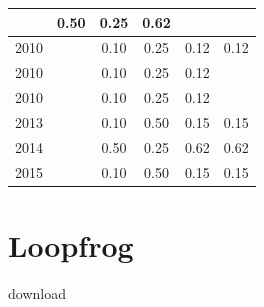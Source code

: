 \begin{table}[H]
\begin{tabular}{| l | c | c | c | c | c |}
          &
          0.50
          &
          0.25
          &
          0.62
          &
          \\
\hline
            2010
          &
          
          &
          0.10
          &
          0.25
          &
          0.12
          &
            {\color{red} 0.12}
          \\
            2010
          &
          
          &
          0.10
          &
          0.25
          &
          0.12
          &
          \\
            2010
          &
          
          &
          0.10
          &
          0.25
          &
          0.12
          &
          \\
\hline
            2013
          &
          
          &
          0.10
          &
          0.50
          &
          0.15
          &
            {\color{red} 0.15}
          \\
\hline
            2014
          &
          
          &
          0.50
          &
          0.25
          &
          0.62
          &
            {\color{blue} 0.62}
          \\
\hline
            2015
          &
          
          &
          0.10
          &
          0.50
          &
          0.15
          &
            {\color{red} 0.15}
          \\
\hline
\end{tabular}
\end{table}



\section{Loopfrog}
\checkmark download


